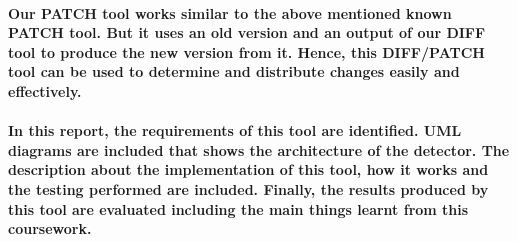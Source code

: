 \documentclass[10pt,a4paper]{report}
\begin{document}
\paragraph{Our PATCH tool works similar to the above mentioned known PATCH tool. But it uses an old version and an output of our DIFF tool to produce the new version from it. Hence, this DIFF/PATCH tool can be used to determine and distribute changes easily and effectively.}

\paragraph{In this report, the requirements of this tool are identified. UML diagrams are included that shows the architecture of the detector. The description about the implementation of this tool, how it works and the testing performed are included.  Finally, the results produced by this tool are evaluated including the main things learnt from this coursework.}
\end{document}

